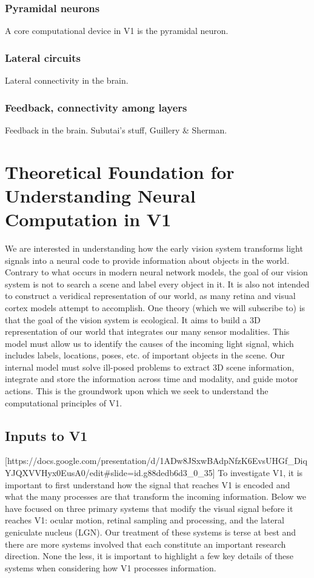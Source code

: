 \subsubsection{Pyramidal neurons}
A core computational device in V1 is the pyramidal neuron.

\subsubsection{Lateral circuits}
Lateral connectivity in the brain.

\subsubsection{Feedback, connectivity among layers}
Feedback in the brain. Subutai's stuff, Guillery \& Sherman.

\section{Theoretical Foundation for Understanding Neural Computation in V1}
We are interested in understanding how the early vision system transforms light signals into a neural code to provide information about objects in the world.
Contrary to what occurs in modern neural network models, the goal of our vision system is not to search a scene and label every object in it. It is also not intended to construct a veridical representation of our world, as many retina and visual cortex models attempt to accomplish. One theory (which we will subscribe to) is that the goal of the vision system is ecological. It aims to build a 3D representation of our world that integrates our many sensor modalities. This model must allow us to identify the causes of the incoming light signal, which includes labels, locations, poses, etc. of important objects in the scene. Our internal model must solve ill-posed problems to extract 3D scene information, integrate and store the information across time and modality, and guide motor actions. This is the groundwork upon which we seek to understand the computational principles of V1.

\subsection{Inputs to V1}
[https://docs.google.com/presentation/d/1ADw8JSxwBAdpNfzK6EvsUHGf_DiqYJQXVVHyx0EusA0/edit#slide=id.g88dedb6d3_0_35]
To investigate V1, it is important to first understand how the signal that reaches V1 is encoded and what the many processes are that transform the incoming information. Below we have focused on three primary systems that modify the visual signal before it reaches V1: ocular motion, retinal sampling and processing, and the lateral geniculate nucleus (LGN). Our treatment of these systems is terse at best and there are more systems involved that each constitute an important research direction. None the less, it is important to highlight a few key details of these systems when considering how V1 processes information.

